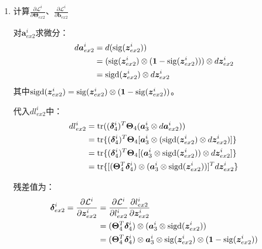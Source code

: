 \documentclass[12pt, a4paper]{article}
\newcommand{\imat}{\bm}
\newcommand{\ivec}{\bm}
\newcommand{\tr}{{\rm tr}}
\newcommand{\sigmoid}{{\rm sig}}
\newcommand{\loss}{\mathcal{L}}
\newcommand{\thetam}{\imat{\Theta}}
\newcommand{\deltav}{\ivec{\delta}}
\newcommand{\av}{\ivec{a}}
\newcommand{\bv}{\ivec{b}}
\newcommand{\zv}{\ivec{z}}
\begin{document}
\begin{enumerate}
            得到梯度:
            \begin{align*}
            \frac{\partial \loss^i}{\partial \thetam_4} &= \deltav_4^i (\av_{ex2}^i \otimes \av_3^i)^T \\
            \frac{\partial \loss^i}{\partial \bv_4} &= \deltav_4^i
            \end{align*}

            对$\loss^i$求和：
            \begin{align}
            \frac{\partial \loss}{\partial \thetam_4} &= \frac{1}{m} \sum_{i=1}^{m} \deltav_4^i (\av_{ex2}^i \otimes \av_3^i)^T \\
            \frac{\partial \loss}{\partial \bv_4} &= \frac{1}{m} \sum_{i=1}^{m} \deltav_4^i
            \end{align}

        \item 计算$\frac{\partial \loss^i}{\partial \thetam_{ex2}}$、$\frac{\partial \loss^i}{\partial \bv_{ex2}}$

            对$\av_{ex2}^i$求微分：
            \begin{align*}
            d \av_{ex2}^i
            &= d (\sigmoid(\zv_{ex2}^i)) \\
            &= (\sigmoid(\zv_{ex2}^i) \otimes (\ivec{1} - \sigmoid(\zv_{ex2}^i))) \otimes d \zv_{ex2}^i \\
            &= {\rm sigd}(\zv_{ex2}^i) \otimes d \zv_{ex2}^i
            \end{align*}
            其中${\rm sigd}(\zv_{ex2}^i) = \sigmoid(\zv_{ex2}^i) \otimes (\ivec{1} - \sigmoid(\zv_{ex2}^i))$。

            代入$d l_{ex2}^i$中：
            \begin{align*}
            d l_{ex2}^i
            &= \tr((\deltav_4^i)^T \thetam_4 (\av_3^i \otimes d \av_{ex2}^i)) \\
            &= \tr\{(\deltav_4^i)^T \thetam_4 [\av_3^i \otimes ({\rm sigd}(\zv_{ex2}^i) \otimes d \zv_{ex2}^i)]\} \\
            &= \tr\{(\deltav_4^i)^T \thetam_4 [(\av_3^i \otimes {\rm sigd}(\zv_{ex2}^i)) \otimes d \zv_{ex2}^i]\} \\
            &= \tr\{[(\thetam_4^T \deltav_4^i) \otimes (\av_3^i \otimes {\rm sigd}(\zv_{ex2}^i))]^T d \zv_{ex2}^i\}
            \end{align*}

            残差值为：
            \begin{equation}\begin{aligned}
            \deltav_{ex2}^i = \frac{\partial \loss^i}{\partial \zv_{ex2}^i}
            &= \frac{\partial \loss^i}{\partial l_{ex2}^i} \frac{\partial l_{ex2}^i}{\partial \zv_{ex2}^i} \\
            &= (\thetam_4^T \deltav_4^i) \otimes (\av_3^i \otimes {\rm sigd}(\zv_{ex2}^i)) \\
            &= (\thetam_4^T \deltav_4^i) \otimes \av_3^i \otimes \sigmoid(\zv_{ex2}^i) \otimes (\ivec{1} - \sigmoid(\zv_{ex2}^i))
            \end{aligned}\end{equation}


\end{enumerate}
\end{document}
